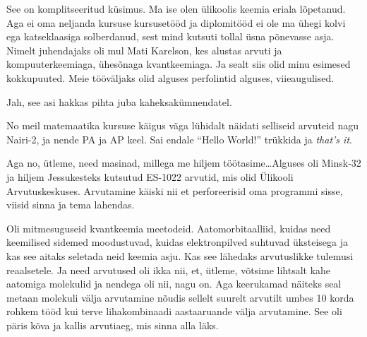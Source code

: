 \label{chptr:lucifer}

                 
See on komplitseeritud küsimus. Ma ise olen ülikoolis keemia eriala lõpetanud. Aga ei oma neljanda kursuse kursusetööd ja diplomitööd ei ole ma ühegi kolvi ega katseklaasiga solberdanud, sest  mind kutsuti tollal üsna põnevasse asja. Nimelt juhendajaks oli mul Mati Karelson, kes alustas arvuti ja kompuuterkeemiaga,  ühesõnaga kvantkeemiaga.  Ja sealt siis olid minu esimesed kokkupuuted. Meie tööväljaks olid alguses perfolintid alguses, viieaugulised.


Jah, see asi hakkas pihta juba kaheksakümnendatel.
                 

No meil matemaatika kursuse käigus väga lühidalt näidati selliseid arvuteid nagu Nairi-2, ja nende PA ja AP keel. Sai endale \enquote{Hello World!} trükkida ja \emph{that's it}. 

Aga no, ütleme, need masinad, millega me hiljem töötasime\ldots Alguses oli Minsk-32 ja hiljem  Jessukesteks kutsutud ES-1022 arvutid, mis olid Ülikooli Arvutuskeskuses. Arvutamine käiski nii et  perforeerisid oma programmi sisse, viisid sinna ja tema lahendas. 


Oli mitmesuguseid kvantkeemia meetodeid. Aatomorbitaalliid, kuidas need keemilised sidemed moodustuvad, kuidas elektronpilved suhtuvad üksteisega ja kas see aitaks seletada neid keemia asju. Kas see lähedaks arvutuslikke tulemusi reaalsetele. Ja need arvutused oli ikka nii, et, ütleme,  võtsime lihtsalt kahe aatomiga molekulid ja nendega oli nii,  nagu on. Aga keerukamad näiteks seal metaan   molekuli välja arvutamine nõudis  sellelt suurelt arvutilt umbes 10 korda rohkem tööd kui terve lihakombinaadi aastaaruande välja arvutamine. See oli päris kõva ja kallis arvutiaeg, mis sinna alla läks.
           

